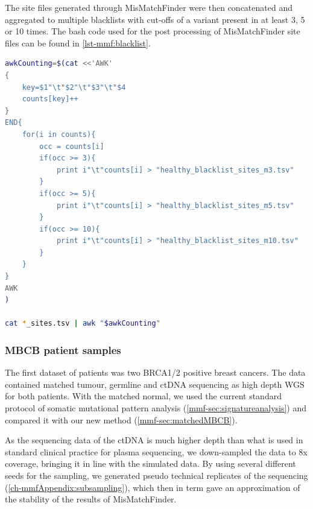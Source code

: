 The site files generated through MisMatchFinder were then concatenated and aggregated to multiple blacklists with cut-offs of a variant present in at least 3, 5 or 10 times. The bash code used for the post processing of MisMatchFinder site files can be found in \autoref{lst-mmf:blacklist}.


\begin{lstlisting}[language=bash, caption=Blacklist postprocessing, label={lst-mmf:blacklist}]
awkCounting=$(cat <<'AWK'
{
    key=$1"\t"$2"\t"$3"\t"$4
    counts[key]++
}
END{
    for(i in counts){
        occ = counts[i]
        if(occ >= 3){
            print i"\t"counts[i] > "healthy_blacklist_sites_m3.tsv"
        }
        if(occ >= 5){
            print i"\t"counts[i] > "healthy_blacklist_sites_m5.tsv"
        }
        if(occ >= 10){
            print i"\t"counts[i] > "healthy_blacklist_sites_m10.tsv"
        }
    }
}
AWK
)

cat *_sites.tsv | awk "$awkCounting"
\end{lstlisting}



\subsubsection{MBCB patient samples}
\label{mmf-sec:brcapatients}
The first dataset of patients was two BRCA1/2 positive breast cancers. The data contained matched tumour, germline and ctDNA sequencing as high depth WGS for both patients. With the matched normal, we used the current standard protocol of somatic mutational pattern analysis (\autoref{mmf-sec:signatureanalysis}) and compared it with our new method (\autoref{mmf-sec:matchedMBCB}). 

As the sequencing data of the ctDNA is much higher depth than what is used in standard clinical practice for plasma sequencing, we down-sampled the data to 8x coverage, bringing it in line with the simulated data. By using several different seeds for the sampling, we generated pseudo technical replicates of the sequencing (\autoref{ch-mmfAppendix:subsampling}), which then in term gave an approximation of the stability of the results of MisMatchFinder.




